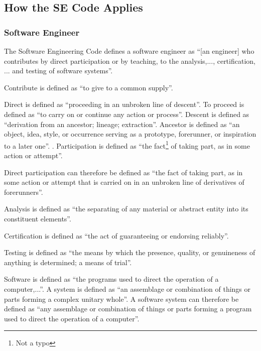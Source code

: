 \subsection{How the SE Code Applies}
\subsubsection{Software Engineer}
The Software Engineering Code\cite{se_code} defines a software engineer as ``[an engineer] who contributes by direct participation or by teaching, to the analysis,..., certification, ... and testing of software systems''. 

Contribute is defined as ``to give to a common supply''\cite{dictionary_com}.

Direct is defined as ``proceeding in an unbroken line of descent''\cite{dictionary_com}. To proceed is defined as ``to carry on or continue any action or process''\cite{dictionary_com}. Descent is defined as ``derivation from an ancestor; lineage; extraction''\cite{dictionary_com}. Ancestor is defined as ``an object, idea, style, or occurrence serving as a prototype, forerunner, or inspiration to a later one''\cite{dictionary_com}. . Participation is defined as ``the fact\footnote{Not a typo} of taking part, as in some action or attempt''\cite{dictionary_com}. 

Direct participation can therefore be defined as ``the fact of taking part, as in some action or attempt that is carried on in an unbroken line of derivatives of forerunners''.

Analysis is defined as ``the separating of any material or abstract entity into its constituent elements''\cite{dictionary_com}.

Certification is defined as ``the act of guaranteeing or endorsing reliably''\cite{dictionary_com}.

Testing is defined as ``the means by which the presence, quality, or genuineness of anything is determined; a means of trial''\cite{dictionary_com}.

Software is defined as ``the programs used to direct the operation of a computer,...''\cite{dictionary_com}. A system is defined as ``an assemblage or combination of things or parts forming a complex unitary whole''. A software system can therefore be defined as ``any assemblage or combination of things or parts forming a program used to direct the operation of a computer''.

